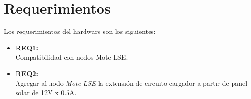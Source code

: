 


\clearpage
\section{Requerimientos}
\label{sec:requerimientos}

\noindent Los requerimientos del hardware son los siguientes:
\begin{itemize}
	\item \textbf{REQ1:}\\ Compatibilidad con nodos Mote LSE.
	\item \textbf{REQ2:}\\ Agregar al nodo \textit{Mote LSE} la extensión de circuito cargador a partir de panel solar de 12V x 0.5A.
\end{itemize}
	
